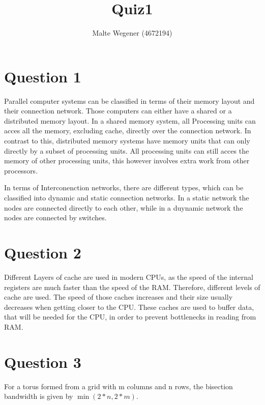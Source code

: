 \documentclass{article}
\begin{document}
\title{Quiz1}
\author{Malte Wegener (4672194)}

\maketitle

\section{Question 1}
Parallel computer systems can be classified in terms of their memory layout and their connection network. Those computers can either have a shared or a distributed memory layout.
In a shared memory system, all Processing units can acces all the memory, excluding cache, directly over the connection network. In contrast to this, distributed memory systems have memory units that can only directly by a subset of processing units.
All processing units can still acces the memory of other processing units, this however involves extra work from other processors. \par

In terms of Interconenction networks, there are different types, which can be classified into dynamic and static connection networks. In a static network the nodes are connected directly to each other, while in a 
duynamic network the nodes are connected by switches.
\section{Question 2}
Different Layers of cache are used in modern CPUs, as the speed of the internal registers are much faster than the speed of the RAM. Therefore, different levels of cache are used. The speed of those caches increases and their size usually decreases when getting closer to the CPU. These caches are used to buffer data, that will be needed for the CPU, in order to prevent bottlenecks in reading from RAM.

\section{Question 3}
For a torus formed from a grid with m columns and n rows, the bisection bandwidth is given by $\min\left(2*n, 2*m\right)$.
\end{document}
